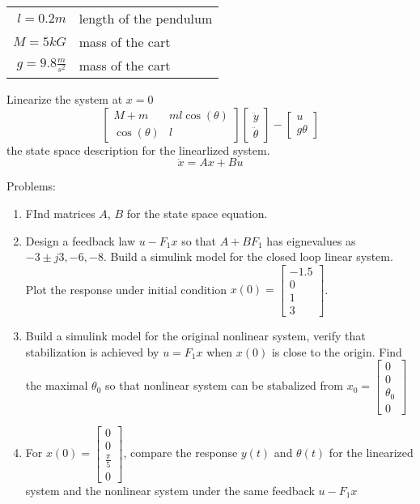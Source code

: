 \documentclass[11pt]{article}
\begin{document}
{\begin{tabular}{r|l}
    $l=0.2m$ & length of the pendulum\\
    $M = 5kG$ & mass of the cart\\
    $g = 9.8\frac m {s^2}$ & mass of the cart
  \end{tabular}
  Linearize the system at $x=0$
  \begin{equation}
    \begin{bmatrix}
      M+m & ml\cos(\theta) \\
      \cos(\theta) & l
    \end{bmatrix}
    \begin{bmatrix}
      \ddot y\\
      \ddot \theta
    \end{bmatrix} -
    \begin{bmatrix}
      u \\
      g\theta
    \end{bmatrix}
  \end{equation}
  the state space description for the linearlized system.
  \begin{equation}
    \dot x = Ax + Bu
  \end{equation}

  Problems:
  \begin{enumerate}[\arabic*.]
  \item FInd matrices $A$, $B$ for the state space equation.
  \item Design a feedback law $u-F_1x$  so that $A+BF_1$ has eignevalues as $-3\pm j3, -6, -8$. Build a simulink
    model for the closed loop linear system. Plot the response under initial condition
    $x(0) = \begin{bmatrix} -1.5 \\ 0 \\ 1 \\ 3 \end{bmatrix}$.
  \item Build a simulink model for the original nonlinear system, verify that stabilization is achieved by
    $u=F_1x$ when $x(0)$ is close to the origin. Find the maximal $\theta_0$ so that nonlinear system can be
    stabalized from $x_0 = \begin{bmatrix}0\\0\\ \theta_0\\0\end{bmatrix}$
  \item For $x(0)=\begin{bmatrix}0\\0\\\frac{\pi} 5\\0\end{bmatrix}$, compare the response $y(t)$ and
    $\theta(t)$ for the linearized system and the nonlinear system under the same feedback $u - F_1x$
  \end{enumerate}
}{}{}
\end{document}
